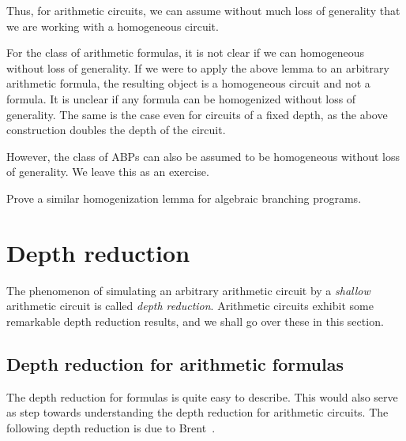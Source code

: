 Thus, for arithmetic circuits, we can assume without much loss of generality that we are working with a homogeneous circuit. 

\begin{remark*}
For the class of arithmetic formulas, it is not clear if we can homogeneous without loss of generality. 
If we were to apply the above lemma to an arbitrary arithmetic formula, the resulting object is a homogeneous circuit and not a formula. 
It is unclear if any formula can be homogenized without loss of generality. 
The same is the case even for circuits of a fixed depth, as the above construction doubles the depth of the circuit. 

However, the class of ABPs can also be assumed to be homogeneous without loss of generality. 
We leave this as an exercise. 
\end{remark*}

\begin{exercise}
Prove a similar homogenization lemma for algebraic branching programs. 
\end{exercise}

\section{Depth reduction}

The phenomenon of simulating an arbitrary arithmetic circuit by a \emph{shallow} arithmetic circuit is called \emph{depth reduction}. 
Arithmetic circuits exhibit some remarkable depth reduction results, and we shall go over these in this section. 

\subsection{Depth reduction for arithmetic formulas}

The depth reduction for formulas is quite easy to describe. 
This would also serve as step towards understanding the depth reduction for arithmetic circuits. 
The following depth reduction is due to Brent~\cite{brent74}. 

